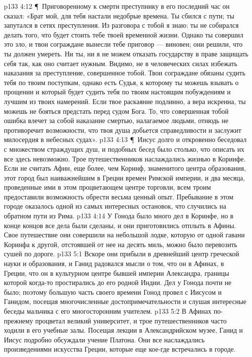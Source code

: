 \vs p133 4:12 \P\ Приговоренному к смерти преступнику в его последний час он сказал: «Брат мой, для тебя настали недобрые времена. Ты сбился с пути; ты запутался в сетях преступления. Из разговора с тобой я знаю: ты не собирался делать того, что будет стоить тебе твоей временной жизни. Однако ты совершил это зло, и твои сограждане вынесли тебе приговор --- виновен; они решили, что ты должен умереть. Ни ты, ни я не можем отказать государству в праве защищать себя так, как оно считает нужным. Видимо, не в человеческих силах избежать наказания за преступление, совершенное тобой. Твои сограждане обязаны судить тебя по твоим поступкам, однако есть Судья, к которому ты можешь взывать о прощении и который будет судить тебя по твоим настоящим побуждениям и лучшим из твоих намерений. Если твое раскаяние подлинно, а вера искренна, ты можешь не бояться предстать перед судом Бога. То, что совершенная тобой ошибка влечет за собой наказание смертью, налагаемое людьми, отнюдь не противоречит возможности, что твоя душа добьется справедливости и заслужит милосердия в небесных судах».
\vs p133 4:13 \P\ Иисус долго и откровенно беседовал с множеством страждущих душ, и подобных бесед было столько, что описать их все здесь невозможно. Трое путешественников наслаждались жизнью в Коринфе. Если не считать Афин, еще более, чем Коринф, знаменитого центра образования, этот город был наиважнейшим в Греции времен Римской империи, и два месяца, проведенные ими в этом процветающем центре торговли, всем троим предоставили возможность обрести весьма ценный опыт. Пребывание в этом городе оказалось одной из самых интересных остановок, что случились на обратном пути из Рима.
\vs p133 4:14 У Гонода было много дел в Коринфе, но в конце концов все дела были сделаны, и они приготовились отплыть в Афины. Свое путешествие они совершили на небольшой лодке, которую от одной гавани Коринфа к другой, отстоявшей от нее на десять миль, можно было перевозить сушей по дороге.
\vs p133 5:1 Вскоре они прибыли в древнейший центр греческой науки и образования, и Ганид радовался мысли о том, что он в Афинах, в Греции, что он в культурном центре бывшей империи Александра, границы которой когда\hyp{}то простирались до его родной Индии. Дел у Гонода почти не было; поэтому большую часть своего времени Гонод провел с Иисусом и Ганидом, посещая многочисленные достопримечательности и слушая интересные беседы мальчика с его многосторонним учителем.
\vs p133 5:2 В Афинах по\hyp{}прежнему процветал великий университет, и трое путешественников часто ходили в его учебные залы. Посещая лекции в Александрийском музее, Ганид и Иисус подробно обсуждали учение Платона. Они все наслаждались произведениями искусства Греции, которые еще кое\hyp{}где встречались в городе.

